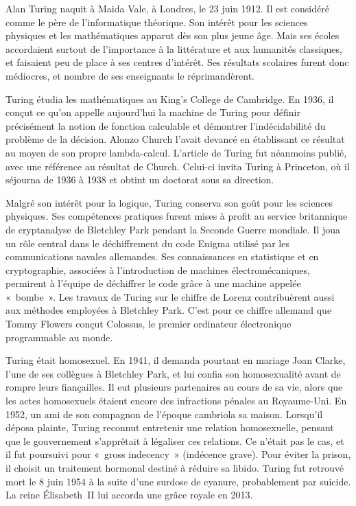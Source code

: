 \documentclass[../../../include/open-logic-section]{subfiles}
\begin{document}


Alan Turing naquit à Maida Vale, à Londres, le 23 juin 1912. Il est
considéré comme le père de l'informatique théorique. Son intérêt pour
les sciences physiques et les mathématiques apparut dès son plus
jeune âge. Mais ses écoles accordaient surtout de l'importance à la
littérature et aux humanités classiques, et faisaient peu de place à
ses centres d'intérêt. Ses résultats scolaires furent donc médiocres,
et nombre de ses enseignants le réprimandèrent.


Turing étudia les mathématiques au King's College de Cambridge.
En 1936, il conçut ce qu'on appelle aujourd'hui la machine de Turing
pour définir précisément la notion de fonction calculable et
démontrer l'indécidabilité du problème de la décision. Alonzo Church
l'avait devancé en établissant ce résultat au moyen de son propre
lambda-calcul. L'article de Turing fut néanmoins publié, avec une
référence au résultat de Church. Celui-ci invita Turing à Princeton,
où il séjourna de 1936 à 1938 et obtint un doctorat sous sa direction.

Malgré son intérêt pour la logique, Turing conserva son goût pour
les sciences physiques. Ses compétences pratiques furent mises à
profit au service britannique de cryptanalyse de Bletchley Park
pendant la Seconde Guerre mondiale. Il joua un rôle central dans le
déchiffrement du code Enigma utilisé par les communications navales
allemandes. Ses connaissances en statistique et en cryptographie,
associées à l'introduction de machines électromécaniques, permirent à
l'équipe de déchiffrer le code grâce à une machine appelée
«~bombe~». Les travaux de Turing sur le chiffre de Lorenz
contribuèrent aussi aux méthodes employées à Bletchley Park.
C'est pour ce chiffre allemand que Tommy Flowers conçut Colossus,
le premier ordinateur électronique programmable au monde.

Turing était homosexuel. En 1941, il demanda pourtant en mariage
Joan Clarke, l'une de ses collègues à Bletchley Park, et lui confia
son homosexualité avant de rompre leurs fiançailles. Il eut
plusieurs partenaires au cours de sa vie, alors que les actes
homosexuels étaient encore des infractions pénales au Royaume-Uni.
En 1952, un ami de son compagnon de l'époque cambriola sa maison.
Lorsqu'il déposa plainte, Turing reconnut entretenir une relation
homosexuelle, pensant que le gouvernement s'apprêtait à légaliser
ces relations. Ce n'était pas le cas, et il fut poursuivi pour
«~gross indecency~» (indécence grave). Pour éviter la prison, il
choisit un traitement hormonal destiné à réduire sa libido. Turing
fut retrouvé mort le 8 juin 1954 à la suite d'une surdose de cyanure,
probablement par suicide. La reine Élisabeth~II lui accorda une
grâce royale en 2013.
\end{document}
